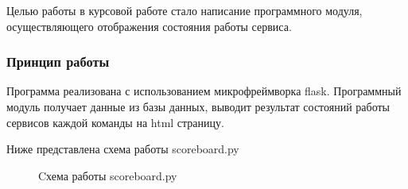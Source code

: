 Целью работы в курсовой работе стало написание программного модуля, осуществляющего отображения состояния работы сервиса.

\subsubsection{Принцип работы}

Программа реализована с использованием микрофреймворка flask. Программный модуль получает данные из базы данных, выводит результат состояний работы сервисов каждой команды на html страницу.

Ниже представлена схема работы scoreboard.py

\begin{figure}[h!]
\caption{Cхема работы scoreboard.py}
\end{figure}

\clearpage